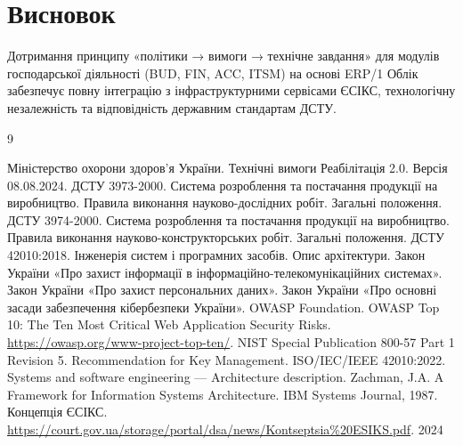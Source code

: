 \documentclass{article}
\begin{document}
\newpage
\section*{Висновок}

Дотримання принципу «політики → вимоги → технічне завдання» для модулів господарської діяльності (BUD, FIN, ACC, ITSM) на основі ERP/1 Облік забезпечує повну інтеграцію з інфраструктурними сервісами ЄСІКС, технологічну незалежність та відповідність державним стандартам ДСТУ.

\begin{thebibliography}{9}

 Міністерство охорони здоров’я України. \newblock Технічні вимоги Реабілітація 2.0. \newblock Версія 08.08.2024.
 ДСТУ 3973-2000. \newblock Система розроблення та постачання продукції на виробництво. Правила виконання науково-дослідних робіт. Загальні положення.
 ДСТУ 3974-2000. \newblock Система розроблення та постачання продукції на виробництво. Правила виконання науково-конструкторських робіт. Загальні положення.
 ДСТУ 42010:2018. \newblock Інженерія систем і програмних засобів. Опис архітектури.
 Закон України «Про захист інформації в інформаційно-телекомунікаційних системах».
 Закон України «Про захист персональних даних».
 Закон України «Про основні засади забезпечення кібербезпеки України».
 OWASP Foundation. \newblock OWASP Top 10: The Ten Most Critical Web Application Security Risks. \newblock \url{https://owasp.org/www-project-top-ten/}.
 NIST Special Publication 800-57 Part 1 Revision 5. \newblock Recommendation for Key Management.
 ISO/IEC/IEEE 42010:2022. \newblock Systems and software engineering — Architecture description.
 Zachman, J.A. \newblock A Framework for Information Systems Architecture. \newblock IBM Systems Journal, 1987.
 Концепція ЄСІКС. \url{https://court.gov.ua/storage/portal/dsa/news/Kontseptsia%20ESIKS.pdf}. 2024

\end{thebibliography}
\end{document}
